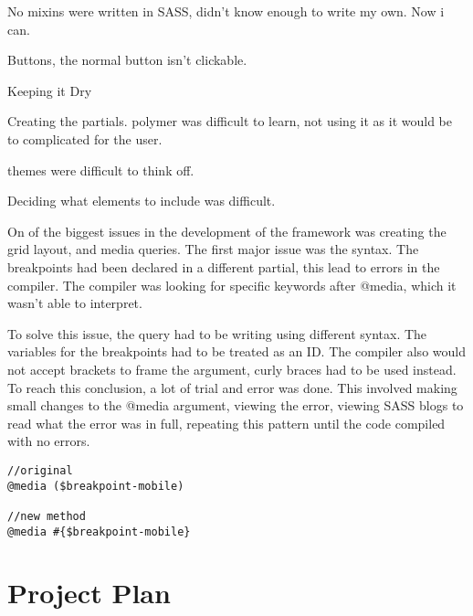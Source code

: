 No mixins were written in SASS, didn't know enough to write my own. Now i can. 

Buttons, the normal button isn't clickable. 

Keeping it Dry

Creating the partials. polymer was difficult to learn, not using it as it would be to complicated for the user. 

themes were difficult to think off. 

Deciding what elements to include was difficult. 

On of the biggest issues in the development of the framework was creating the grid layout, and media queries. The first major issue was the syntax. The breakpoints had been declared in a different partial, this lead to errors in the compiler. The compiler was looking for specific keywords after @media, which it wasn't able to interpret.

To solve this issue, the query had to be writing using different syntax. The variables for the breakpoints had to be treated as an ID. The compiler also would not accept brackets to frame the argument, curly braces had to be used instead. To reach this conclusion, a lot of trial and error was done. This involved making small changes to the @media argument, viewing  the error, viewing SASS blogs to read what the error was in full, repeating this pattern until the code compiled with no errors. 
\begin{lstlisting}[language=CSS3]
//original 
@media ($breakpoint-mobile)

//new method
@media #{$breakpoint-mobile} 
\end{lstlisting}



\newpage
\section*{Project Plan}
